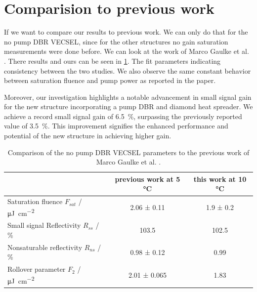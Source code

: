 \section{Comparision to previous work}

If we want to compare our results to previous work. We can only do that for the no pump DBR VECSEL, since for the other structures no gain saturation measurements were done before. We can look at the work of Marco Gaulke et al. \cite{Gaulke2021HighCharacterization}. There results and ours can be seen in \cref{tab:comp}. 
The fit parameters indicating consistency between the two studies. We also observe the same constant behavior between saturation fluence and pump power as reported in the paper. 

Moreover, our investigation highlights a notable advancement in small signal gain for the new structure incorporating a pump DBR and diamond heat spreader. We achieve a record small signal gain of \qty{6.5}{\percent}, surpassing the previously reported value of \qty{3.5}{\percent}. This improvement signifies the enhanced performance and potential of the new structure in achieving higher gain.
\begin{table}[ht]
    \begin{tabular}{lcc}
        \cline{2-3}
                                                                      & previous work at 5 °C & this work at 10 °C \\ \hline
        Saturation fluence $F_{sat}$ / \unit{\micro\J\per\cm\squared} & 2.06 ± 0.11                                                                          & 1.9 ± 0.2                                                                        \\\hline
        Small signal Reflectivity $R_{ss}$ / \%                       & 103.5                                                                                & 102.5                                                                            \\\hline
        Nonsaturable reflectivity $R_{ns}$ / \%                       & 0.98 ± 0.12                                                                          & 0.99                                                                             \\\hline
        Rollover parameter $F_{2}$ / \unit{\micro\J\per\cm\squared}  & 2.01 ± 0.065                                                                         & 1.83
    \end{tabular}
    \caption{Comparison of the no pump DBR VECSEL parameters to the previous work of Marco Gaulke et al. \cite{Gaulke2021HighCharacterization}.\vspace{-1\baselineskip}}
    \label{tab:comp}
\end{table}   